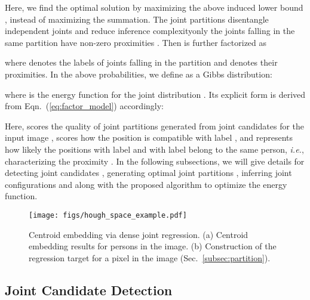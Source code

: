 \documentclass[10pt,twocolumn,letterpaper]{article}
\begin{document}
Here, we find the optimal solution by maximizing the above induced lower bound  , instead of maximizing the summation.
The joint partitions  disentangle independent joints and reduce inference complexity\textemdash  only the joints falling in the same partition have non-zero proximities . Then  is further factorized as

where  denotes the labels of joints falling in the partition  and  denotes their  proximities. In the above probabilities, we define  as a Gibbs distribution:

where  is the energy function for the joint distribution . Its explicit form is derived from Eqn.~(\ref{eq:factor_model}) accordingly:

Here,  scores the quality of joint partitions   generated from joint candidates  for the input image , 
scores how the position  is compatible with label , and  represents how likely the positions  with label  and  with label  belong to the same person, \emph{i.e.}, characterizing the proximity .
In the following subsections, we will give  details for detecting joint candidates , generating optimal joint partitions , inferring joint configurations  and  along with the proposed algorithm to optimize the energy function.

\begin{figure}[t!]
\begin{center}
\texttt{[image: figs/hough\_space\_example.pdf]}
\caption{Centroid embedding via dense joint regression. (a)  Centroid embedding results for persons in the image. (b) Construction of the regression target for a pixel in the image (Sec.~\ref{subsec:partition}).}
\label{fig:center_embedding_example}
\end{center}
\vspace{-20pt}
\end{figure}

\subsection{Joint Candidate Detection}
\label{subsec:joint_detection}
\end{document}

